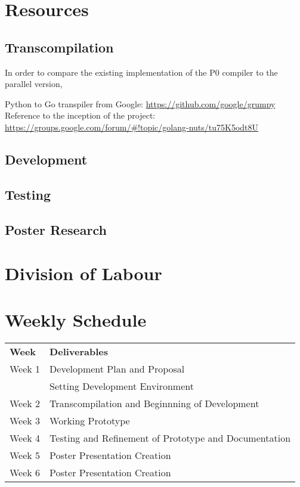 \documentclass{article}
\begin{document}
\section{Resources}

\subsection{Transcompilation} %

In order to compare the existing implementation of the P0 compiler to the
parallel version, 

Python to Go transpiler from Google: \url{https://github.com/google/grumpy}
Reference to the inception of the project: \url{https://groups.google.com/forum/#!topic/golang-nuts/tu75K5odt8U}

\subsection{Development} %

\subsection{Testing} %

\subsection{Poster Research} %

\section{Division of Labour} %

\section{Weekly Schedule} %

\begin{center}
\begin{tabular}{ l | l }
  \textbf{Week} & \textbf{Deliverables} \\
  \hhline{=|=}
  Week 1 & Development Plan and Proposal\\
         & Setting Development Environment\\ 
  Week 2 & Transcompilation and Beginnning of Development\\
  Week 3 & Working Prototype\\
  Week 4 & Testing and Refinement of Prototype and Documentation\\
  Week 5 & Poster Presentation Creation\\
  Week 6 & Poster Presentation Creation\\
\end{tabular}
\end{center}

\end{document}
